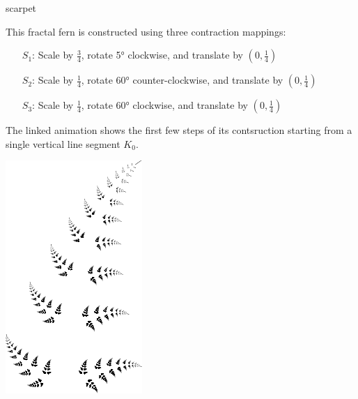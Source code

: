 \begin{examples}{}{scarpet}
\begin{enumerate}
		
		\begin{minipage}[t]{0.72\linewidth}\vspace{0pt}
			\item This fractal fern is constructed using three contraction mappings:
			\begin{itemize}
				\item[$S_1$:] Scale by $\frac 34$, rotate \ang{5} clockwise, and translate by $(0,\frac 14)$
				\item[$S_2$:] Scale by $\frac 14$, rotate \ang{60} counter-clockwise, and translate by $(0,\frac 14)$
				\item[$S_3$:] Scale by $\frac 14$, rotate \ang{60} clockwise, and translate by $(0,\frac 14)$
			\end{itemize}
			The linked animation shows the first few steps of its contsruction starting from a single vertical line segment $K_0$.
		\end{minipage}
		\hfill
		\begin{minipage}[t]{0.27\linewidth}\vspace{0pt}
			\flushright \href{http://www.math.uci.edu/~ndonalds/math161/fern-anim.html}{\includegraphics[scale=1]{fern2}}
		\end{minipage}
	\end{enumerate}
\end{examples}


\goodbreak


